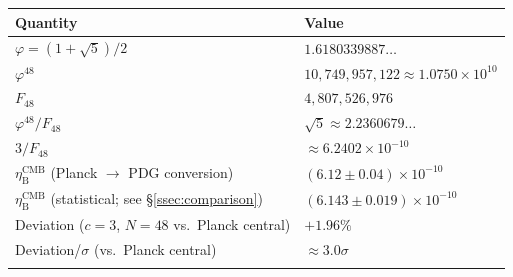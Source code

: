 \documentclass[sn-mathphys-num,Numbered]{sn-jnl}
\theoremstyle{thmstyleone}
\theoremstyle{thmstylethree}
\theoremstyle{thmstyletwo}
\newcommand{\etaB}{\eta_{\mathrm{B}}}
\begin{document}
\begin{appendices}
\vspace{6pt}
\noindent{}
\label{tab:numerical}
\begin{tabular}{@{}p{6cm}p{5.5cm}@{}}
\toprule
Quantity & Value \\
\midrule
$\varphi = (1+\sqrt{5})/2$ & $1.6180339887\ldots$ \\
$\varphi^{48}$ & $10{,}749{,}957{,}122 \approx 1.0750\times10^{10}$ \\
$F_{48}$ & $4{,}807{,}526{,}976$ \\
$\varphi^{48}/F_{48}$ & $\sqrt{5} \approx 2.2360679\ldots$ \\
$3/F_{48}$ & $\approx 6.2402\times10^{-10}$ \\
$\etaB^{\mathrm{CMB}}$ (Planck $\to$ PDG conversion) &
  $(6.12\pm0.04)\times10^{-10}$ \\
$\etaB^{\mathrm{CMB}}$ (statistical; see \S\ref{ssec:comparison}) &
  $(6.143\pm0.019)\times10^{-10}$ \\
Deviation ($c=3$, $N=48$ vs.\ Planck central) & $+1.96\%$ \\
Deviation/$\sigma$ (vs.\ Planck central) & $\approx 3.0\sigma$ \\
\botrule
\end{tabular}
\vspace{4pt}


\clearpage
\end{appendices}


\end{document}
